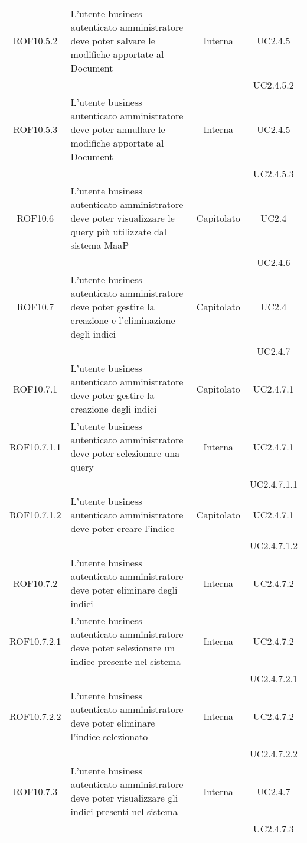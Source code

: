 \begin{longtable}{|c|p{6cm}|c|c|}
\midrule
ROF10.5.2
& L'utente business autenticato amministratore deve poter salvare le modifiche apportate al Document
& Interna
& UC2.4.5\\
& & & UC2.4.5.2
\\

\midrule
ROF10.5.3
& L'utente business autenticato amministratore deve poter annullare le modifiche apportate al Document
& Interna
& UC2.4.5\\
& & & UC2.4.5.3
\\

\midrule
ROF10.6
& L'utente business autenticato amministratore deve poter visualizzare le query più utilizzate dal sistema MaaP
& Capitolato
& UC2.4\\
& & & UC2.4.6
\\

\midrule
ROF10.7
& L'utente business autenticato amministratore deve poter gestire la creazione e l'eliminazione degli indici
& Capitolato
& UC2.4\\
& & & UC2.4.7
\\

\midrule
ROF10.7.1
& L'utente business autenticato amministratore deve poter gestire la creazione degli indici
& Capitolato
& UC2.4.7.1\\

\midrule
ROF10.7.1.1
& L'utente business autenticato amministratore deve poter selezionare una query
& Interna
& UC2.4.7.1\\
& & & UC2.4.7.1.1
\\

\midrule
ROF10.7.1.2
& L'utente business autenticato amministratore deve poter creare l'indice
& Capitolato
& UC2.4.7.1\\
& & & UC2.4.7.1.2
\\


\midrule
ROF10.7.2
& L'utente business autenticato amministratore deve poter eliminare degli indici
& Interna
& UC2.4.7.2\\

\midrule
ROF10.7.2.1
& L'utente business autenticato amministratore deve poter selezionare un indice presente nel sistema
& Interna
& UC2.4.7.2\\
& & & UC2.4.7.2.1
\\

\midrule
ROF10.7.2.2
& L'utente business autenticato amministratore deve poter eliminare l'indice selezionato
& Interna
& UC2.4.7.2\\
& & & UC2.4.7.2.2
\\

\midrule
ROF10.7.3
& L'utente business autenticato amministratore deve poter visualizzare gli indici presenti nel sistema
& Interna
& UC2.4.7\\
& & & UC2.4.7.3
\\


\end{longtable}

